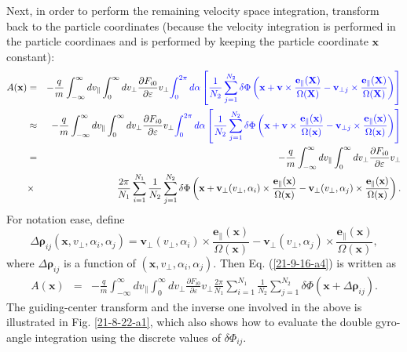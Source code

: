\documentclass{llncs}
\newcommand{\tmcolor}[2]{{\color{#1}{#2}}}
\begin{document}
Next, in order to perform the remaining velocity space integration, transform
back to the particle coordinates (because the velocity integration is
performed in the particle coordinaes and is performed by keeping the particle
coordinate $\mathbf{x}$ constant):
\begin{eqnarray}
  A (\mathbf{x}) & = & - \frac{q}{m} \int_{- \infty}^{\infty} d v_{\parallel}
  \int_0^{\infty} d v_{\perp} \frac{\partial F_{i 0}}{\partial \varepsilon}
  v_{\perp} \tmcolor{blue}{\int_0^{2 \pi} d \alpha \left[ \frac{1}{N_2}
  \sum_{j = 1}^{N_2} \delta \Phi \left( \mathbf{x} +\mathbf{v} \times
  \frac{\mathbf{e}_{\parallel} (\mathbf{X})}{\Omega (\mathbf{X})}
  -\mathbf{v}_{\perp j} \times \frac{\mathbf{e}_{\parallel}
  (\mathbf{X})}{\Omega (\mathbf{X})} \right) \right]} \nonumber\\
  & \approx & - \frac{q}{m} \int_{- \infty}^{\infty} d v_{\parallel}
  \int_0^{\infty} d v_{\perp} \frac{\partial F_{i 0}}{\partial \varepsilon}
  v_{\perp} \tmcolor{blue}{\int_0^{2 \pi} d \alpha \left[ \frac{1}{N_2}
  \sum_{j = 1}^{N_2} \delta \Phi \left( \mathbf{x} +\mathbf{v} \times
  \frac{\mathbf{e}_{\parallel} (\mathbf{x})}{\Omega (\mathbf{x})}
  -\mathbf{v}_{\perp j} \times \frac{\mathbf{e}_{\parallel}
  (\mathbf{x})}{\Omega (\mathbf{x})} \right) \right]} \nonumber\\
  & = & - \frac{q}{m}  \int_{- \infty}^{\infty} d v_{\parallel}
  \int_0^{\infty} d v_{\perp} \frac{\partial F_{i 0}}{\partial \varepsilon}
  v_{\perp} \nonumber\\
  & \times & \frac{2 \pi}{N_1} \sum_{i = 1}^{N_1} \frac{1}{N_2}  \sum_{j =
  1}^{N_2} \delta \Phi \left( \mathbf{x} +\mathbf{v}_{\perp} (v_{\perp},
  \alpha_i) \times \frac{\mathbf{e}_{\parallel} (\mathbf{x})}{\Omega
  (\mathbf{x})} -\mathbf{v}_{\perp} (v_{\perp}, \alpha_j) \times
  \frac{\mathbf{e}_{\parallel} (\mathbf{x})}{\Omega (\mathbf{x})} \right) . 
  \label{21-9-16-a4}
\end{eqnarray}
For notation ease, define
\begin{equation}
  \Delta \mathbf{\rho}_{i j} (\mathbf{x}, v_{\perp}, \alpha_i, \alpha_j)
  =\mathbf{v}_{\perp} (v_{\perp}, \alpha_i) \times
  \frac{\mathbf{e}_{\parallel} (\mathbf{x})}{\Omega (\mathbf{x})}
  -\mathbf{v}_{\perp} (v_{\perp}, \alpha_j) \times
  \frac{\mathbf{e}_{\parallel} (\mathbf{x})}{\Omega (\mathbf{x})},
\end{equation}
where $\Delta \mathbf{\rho}_{i j}$ is a function of $(\mathbf{x}, v_{\perp},
\alpha_i, \alpha_j)$. Then Eq. (\ref{21-9-16-a4}) is written as
\begin{eqnarray}
  A (\mathbf{x}) & = & - \frac{q}{m}  \int_{- \infty}^{\infty} d v_{\parallel}
  \int_0^{\infty} d v_{\perp} \frac{\partial F_{i 0}}{\partial \varepsilon}
  v_{\perp} \frac{2 \pi}{N_1} \sum_{i = 1}^{N_1} \frac{1}{N_2}  \sum_{j =
  1}^{N_2} \delta \Phi (\mathbf{x} + \Delta \mathbf{\rho}_{i j}) . 
\end{eqnarray}
The guiding-center transform and the inverse one involved in the above is
illustrated in Fig. \ref{21-8-22-a1}, which also shows how to evaluate the
double gyro-angle integration using the discrete values of $\delta \Phi_{i
j}$.
\end{document}
